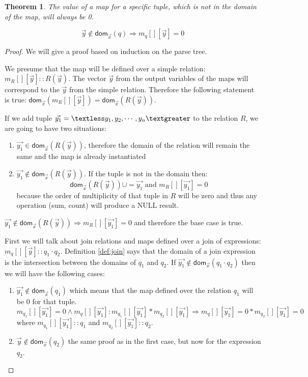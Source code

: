\documentclass[12pt]{article}
\newtheorem{theorem}{Theorem}[section]
\newcommand{\dom}{\textsf{dom}}
\begin{document}
\begin{theorem}
The value of a map for a specific tuple, which is not in the domain of the map, will always be 0.
\end{theorem}
$$\vec{y}\notin\dom{}_{\vec{x}}(q)\Rightarrow m_q[][\vec{y}]=0$$

\begin{proof}
We will give a proof based on induction on the parse tree.

We presume that the map will be defined over a simple relation: $m_R[][\vec{y}]::R(\vec{y})$. The vector $\vec{y}$ from the output variables of the maps will correspond to the $\vec{y}$ from the simple relation. Therefore the following statement is true: $\dom{}_{\vec{x}}(m_R[][\vec{y}])=\dom{}_{\vec{x}}(R(\vec{y}))$.

If we add tuple $\vec{y_1}=\textless y_1,y_2,\cdots,y_n\textgreater$ to the relation $R$, we are going to have two situations:
\begin{enumerate}
\item $\vec{y_1}\in\dom{}_{\vec{x}}(R(\vec{y}))$, therefore the domain of the relation will remain the same and the map is already instantiated
\item $\vec{y_1}\notin\dom{}_{\vec{x}}(R(\vec{y}))$. If the tuple is not in the domain then: $$\dom{}_{\vec x}(R(\vec y))\cup=\vec{y_1}\mbox{ and }m_{R}[][\vec{y_1}]=0$$ because the order of multiplicity of that tuple in $R$ will be zero and thus any operation (sum, count) will produce a NULL result.
\end{enumerate}

$\vec{y_1}\notin\dom{}_{\vec{x}}(R(\vec{y}))\Rightarrow m_R[][\vec{y_1}]=0$ and therefore the base case is true.

First we will talk about join relations and maps defined over a join of expressions: $m_q[][\vec{y}]::q_1\cdot q_2$. Definition \ref{def:join} says that the domain of a join expression is the intersection between the domains of $q_1$ and $q_2$. If $\vec{y_1}\notin\dom{}_{\vec{x}}(q_1\cdot q_2)$ then we will have the following cases:
\begin{enumerate}
\item $\vec{y_1}\notin\dom{}_{\vec{x}}(q_1)$ which means that the map defined over the relation $q_1$ will be 0 for that tuple.
$$m_{q_1}[][\vec{y_1}]=0\land m_q[][\vec{y_1}]: m_{q_1}[][\vec{y_1}]*m_{q_2}[][\vec{y_1}]\Rightarrow m_{q}[][\vec{y_1}]=0*m_{q_2}[][\vec{y_1}]=0$$
where $m_{q_1}[][\vec{y_1}]::q_1$ and $m_{q_2}[][\vec{y_1}]::q_2$.
\item $\vec{y}\notin\dom{}_{\vec{x}}(q_2)$ the same proof as in the first case, but now for the expression $q_2$.
\end{enumerate}


\end{proof}
\end{document}
